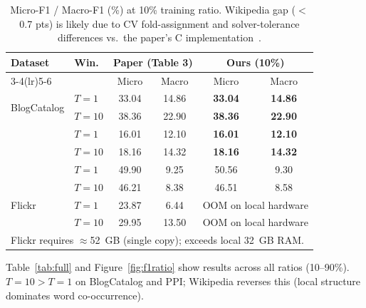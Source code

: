 \documentclass[10pt,letterpaper]{article}
\begin{document}
\begin{table}[h]
\centering\vspace{-4pt}
\caption{Micro-F1 / Macro-F1 (\%) at 10\% training ratio.
  Wikipedia gap ($<$0.7 pts) is likely due to CV fold-assignment and solver-tolerance differences vs.\ the paper's C implementation~\cite{liblinear}.}
\label{tab:compare}
\setlength{\tabcolsep}{3.5pt}\small
\begin{tabular}{llcccc}
\toprule
\multirow{2}{*}{\textbf{Dataset}} & \multirow{2}{*}{\textbf{Win.}} &
  \multicolumn{2}{c}{\textbf{Paper (Table 3)}} &
  \multicolumn{2}{c}{\textbf{Ours (10\%)}} \\
\cmidrule(lr){3-4}\cmidrule(lr){5-6}
& & Micro & Macro & Micro & Macro \\
\midrule
\multirow{2}{*}{BlogCatalog} & $T{=}1$  & 33.04 & 14.86 & \textbf{33.04} & \textbf{14.86} \\
                              & $T{=}10$ & 38.36 & 22.90 & \textbf{38.36} & \textbf{22.90} \\
\addlinespace
\multirow{2}{*}{PPI}         & $T{=}1$  & 16.01 & 12.10 & \textbf{16.01} & \textbf{12.10} \\
                              & $T{=}10$ & 18.16 & 14.32 & \textbf{18.16} & \textbf{14.32} \\
\addlinespace
\multirow{2}{*}{Wikipedia}   & $T{=}1$  & 49.90 &  9.25 & 50.56 &  9.30 \\
                              & $T{=}10$ & 46.21 &  8.38 & 46.51 &  8.58 \\
\addlinespace
Flickr & $T{=}1$  & 23.87 & 6.44 & \multicolumn{2}{c}{OOM on local hardware} \\
       & $T{=}10$ & 29.95 & 13.50& \multicolumn{2}{c}{OOM on local hardware} \\
\bottomrule
\multicolumn{6}{l}{\small Flickr requires $\approx$52~GB (single copy); exceeds local 32~GB RAM.}
\end{tabular}
\end{table}

Table~\ref{tab:full} and Figure~\ref{fig:f1ratio} show results across all ratios (10--90\%).
$T{=}10 > T{=}1$ on BlogCatalog and PPI; Wikipedia reverses this (local structure dominates word co-occurrence).
\end{document}
